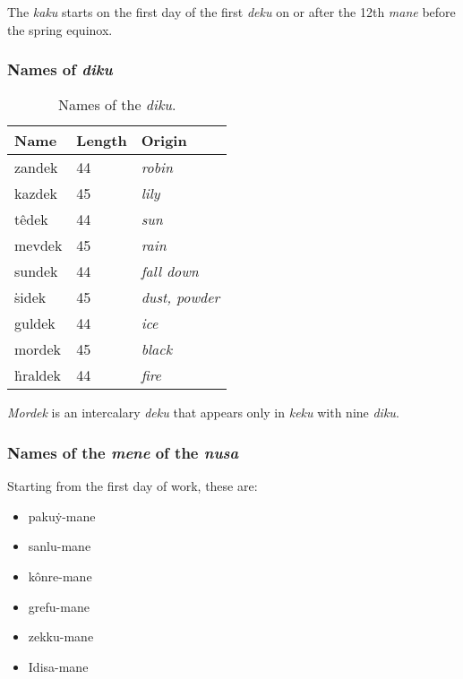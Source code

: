 \documentclass{book}
\begin{document}
The \emph{kaku} starts on the first day of the first \emph{deku} on or after the 12th \emph{mane} before the spring equinox.

\newpage
\subsubsection{Names of \emph{diku}}

\begin{table}[h]
    \caption{Names of the \emph{diku}.}
    \centering
    \begin{tabu}{|l|l|X|}
        \hline
        Name & Length & Origin \\
        \hline
        zandek & 44 &  \emph{robin} \\
        kazdek & 45 &  \emph{lily} \\
        têdek & 44 &  \emph{sun} \\
        mevdek & 45 &  \emph{rain} \\
        sundek & 44 &  \emph{fall down} \\
        ṡidek & 45 &  \emph{dust, powder} \\
        guldek & 44 &  \emph{ice} \\
        mordek & 45 &  \emph{black} \\
        ḣraldek & 44 &  \emph{fire} \\
        \hline
    \end{tabu}
\end{table}

\emph{Mordek} is an intercalary \emph{deku} that appears only in \emph{keku} with nine \emph{diku}.

\subsubsection{Names of the \emph{mene} of the \emph{nusa}}

Starting from the first day of work, these are:

\begin{itemize}
    \item pakuẏ-mane
    \item sanlu-mane
    \item kônre-mane
    \item grefu-mane
    \item zekku-mane
    \item Idisa-mane
\end{itemize}
\end{document}
